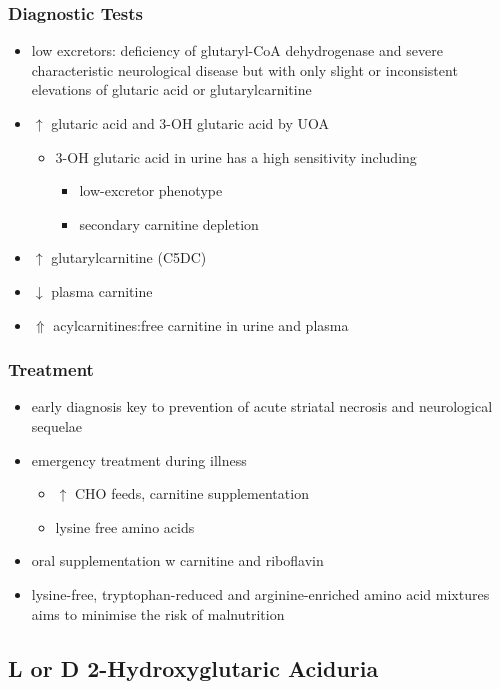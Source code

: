 \documentclass{scrartcl}
\begin{document}
\subsubsection{Diagnostic Tests}
\label{sec:orgd4fbbe7}
\begin{itemize}
\item low excretors: deficiency of glutaryl-CoA dehydrogenase and severe
characteristic neurological disease but with only slight or
inconsistent elevations of glutaric acid or glutarylcarnitine
\item \(\uparrow\) glutaric acid and 3-OH glutaric acid by UOA
\begin{itemize}
\item 3-OH glutaric acid in urine has a high sensitivity including
\begin{itemize}
\item low-excretor phenotype
\item secondary carnitine depletion
\end{itemize}
\end{itemize}
\item \(\uparrow\) glutarylcarnitine (C5DC)
\item \(\downarrow\) plasma carnitine
\item \(\Uparrow\) acylcarnitines:free carnitine in urine and plasma
\end{itemize}

\subsubsection{Treatment}
\label{sec:org33641b0}
\begin{itemize}
\item early diagnosis key to prevention of acute striatal necrosis and
neurological sequelae
\item emergency treatment during illness
\begin{itemize}
\item \(\uparrow\) CHO feeds, carnitine supplementation
\item lysine free amino acids
\end{itemize}
\item oral supplementation w carnitine and riboflavin
\item lysine-free, tryptophan-reduced and arginine-enriched amino acid
mixtures aims to minimise the risk of malnutrition
\end{itemize}

\subsection{L or D 2-Hydroxyglutaric Aciduria}
\label{sec:orgbea3bba}
\end{document}
